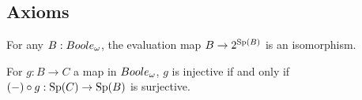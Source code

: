 \subsection{Axioms}\label{Axioms}
\begin{axiom}\label{AxStoneDuality}
  For any $B:\Boole$, 
  the evaluation map $B\rightarrow  2^{\operatorname{Sp}(B)}$ is an isomorphism.
\end{axiom} 


\begin{axiom}\label{SurjectionsAreFormalSurjections}
  For $g:B\to C$ a map in $\Boole$, $g$ is injective if and only if
  $(-)\circ g: \operatorname{Sp}(C) \to \operatorname{Sp}(B)$ is surjective. 
\end{axiom} 
%

